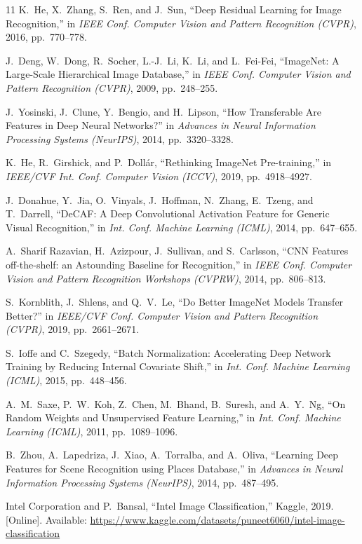 \documentclass[conference]{IEEEtran}
\begin{document}
\begin{thebibliography}{11}
K.~He, X.~Zhang, S.~Ren, and J.~Sun, ``Deep Residual Learning for Image Recognition,'' in \textit{IEEE Conf. Computer Vision and Pattern Recognition (CVPR)}, 2016, pp.~770--778.

J.~Deng, W.~Dong, R.~Socher, L.-J.~Li, K.~Li, and L.~Fei-Fei, ``ImageNet: A Large-Scale Hierarchical Image Database,'' in \textit{IEEE Conf. Computer Vision and Pattern Recognition (CVPR)}, 2009, pp.~248--255.

J.~Yosinski, J.~Clune, Y.~Bengio, and H.~Lipson, ``How Transferable Are Features in Deep Neural Networks?'' in \textit{Advances in Neural Information Processing Systems (NeurIPS)}, 2014, pp.~3320--3328.

K.~He, R.~Girshick, and P.~Doll\'ar, ``Rethinking ImageNet Pre-training,'' in \textit{IEEE/CVF Int. Conf. Computer Vision (ICCV)}, 2019, pp.~4918--4927.

J.~Donahue, Y.~Jia, O.~Vinyals, J.~Hoffman, N.~Zhang, E.~Tzeng, and T.~Darrell, ``DeCAF: A Deep Convolutional Activation Feature for Generic Visual Recognition,'' in \textit{Int. Conf. Machine Learning (ICML)}, 2014, pp.~647--655.

A.~Sharif Razavian, H.~Azizpour, J.~Sullivan, and S.~Carlsson, ``CNN Features off-the-shelf: an Astounding Baseline for Recognition,'' in \textit{IEEE Conf. Computer Vision and Pattern Recognition Workshops (CVPRW)}, 2014, pp.~806--813.

S.~Kornblith, J.~Shlens, and Q.~V.~Le, ``Do Better ImageNet Models Transfer Better?'' in \textit{IEEE/CVF Conf. Computer Vision and Pattern Recognition (CVPR)}, 2019, pp.~2661--2671.

S.~Ioffe and C.~Szegedy, ``Batch Normalization: Accelerating Deep Network Training by Reducing Internal Covariate Shift,'' in \textit{Int. Conf. Machine Learning (ICML)}, 2015, pp.~448--456.

A.~M.~Saxe, P.~W.~Koh, Z.~Chen, M.~Bhand, B.~Suresh, and A.~Y.~Ng, ``On Random Weights and Unsupervised Feature Learning,'' in \textit{Int. Conf. Machine Learning (ICML)}, 2011, pp.~1089--1096.

B.~Zhou, A.~Lapedriza, J.~Xiao, A.~Torralba, and A.~Oliva, ``Learning Deep Features for Scene Recognition using Places Database,'' in \textit{Advances in Neural Information Processing Systems (NeurIPS)}, 2014, pp.~487--495.

Intel Corporation and P.~Bansal, ``Intel Image Classification,'' Kaggle, 2019. [Online]. Available: \url{https://www.kaggle.com/datasets/puneet6060/intel-image-classification}
\end{thebibliography}
\end{document}
